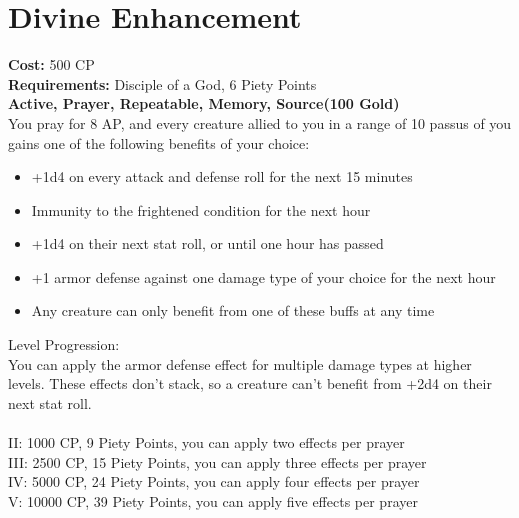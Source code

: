 \section{Divine Enhancement}
\textbf{Cost:} 500 CP\\
\textbf{Requirements:} Disciple of a God, 6 Piety Points \\
\textbf{Active, Prayer, Repeatable, Memory, Source(100 Gold)}\\
You pray for 8 AP, and every creature allied to you in a range of 10 passus of you gains one of the following benefits of your choice:
\begin{itemize}
	\item +1d4 on every attack and defense roll for the next 15 minutes
	\item Immunity to the frightened condition for the next hour
	\item +1d4 on their next stat roll, or until one hour has passed
	\item +1 armor defense against one damage type of your choice for the next hour
	\item Any creature can only benefit from one of these buffs at any time
\end{itemize}

Level Progression:\\
You can apply the armor defense effect for multiple damage types at higher levels. These effects don't stack, so a creature can't benefit from +2d4 on their next stat roll.\\
\\
II: 1000 CP, 9 Piety Points, you can apply two effects per prayer\\
III: 2500 CP, 15 Piety Points, you can apply three effects per prayer\\
IV: 5000 CP, 24 Piety Points, you can apply four effects per prayer\\
V: 10000 CP, 39 Piety Points, you can apply five effects per prayer\\